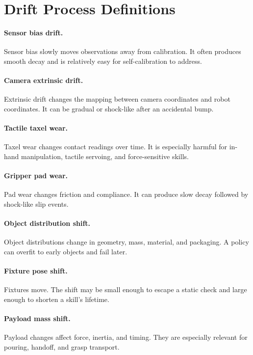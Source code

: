 \documentclass{article}
\begin{document}
\section{Drift Process Definitions}

\paragraph{Sensor bias drift.}
Sensor bias slowly moves observations away from calibration. It often produces
smooth decay and is relatively easy for self-calibration to address.

\paragraph{Camera extrinsic drift.}
Extrinsic drift changes the mapping between camera coordinates and robot
coordinates. It can be gradual or shock-like after an accidental bump.

\paragraph{Tactile taxel wear.}
Taxel wear changes contact readings over time. It is especially harmful for
in-hand manipulation, tactile servoing, and force-sensitive skills.

\paragraph{Gripper pad wear.}
Pad wear changes friction and compliance. It can produce slow decay followed by
shock-like slip events.

\paragraph{Object distribution shift.}
Object distributions change in geometry, mass, material, and packaging. A
policy can overfit to early objects and fail later.

\paragraph{Fixture pose shift.}
Fixtures move. The shift may be small enough to escape a static check and large
enough to shorten a skill's lifetime.

\paragraph{Payload mass shift.}
Payload changes affect force, inertia, and timing. They are especially relevant
for pouring, handoff, and grasp transport.
\end{document}
